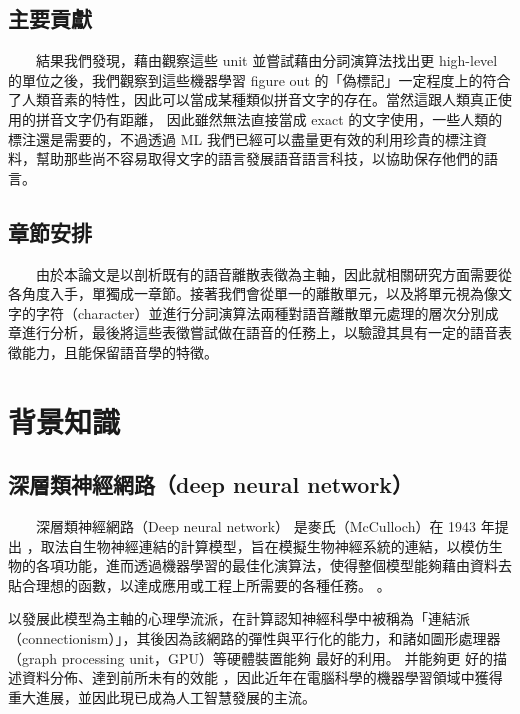 \section{主要貢獻}  %

　　結果我們發現，藉由觀察這些 unit 並嘗試藉由分詞演算法找出更 high-level 的單位之後，我們觀察到這些機器學習 figure out 的「偽標記」一定程度上的符合了人類音素的特性，因此可以當成某種類似拼音文字的存在。當然這跟人類真正使用的拼音文字仍有距離，
因此雖然無法直接當成 exact 的文字使用，一些人類的標注還是需要的，不過透過 ML 我們已經可以盡量更有效的利用珍貴的標注資料，幫助那些尚不容易取得文字的語言發展語音語言科技，以協助保存他們的語言。


\section{章節安排}

　　由於本論文是以剖析既有的語音離散表徵為主軸，因此就相關研究方面需要從各角度入手，單獨成一章節。接著我們會從單一的離散單元，以及將單元視為像文字的字符（character）並進行分詞演算法兩種對語音離散單元處理的層次分別成章進行分析，最後將這些表徵嘗試做在語音的任務上，以驗證其具有一定的語音表徵能力，且能保留語音學的特徵。






\chapter{背景知識}
\section{深層類神經網路（deep neural network）}

　　深層類神經網路（Deep neural network） 是麥氏（McCulloch）在 1943 年提出 \cite{mcculloch1943logical}，取法自生物神經連結的計算模型，旨在模擬生物神經系統的連結，以模仿生物的各項功能，進而透過機器學習的最佳化演算法，使得整個模型能夠藉由資料去貼合理想的函數，以達成應用或工程上所需要的各種任務。 。

    以發展此模型為主軸的心理學流派，在計算認知神經科學中被稱為「連結派（connectionism）」，其後因為該網路的彈性與平行化的能力，和諸如圖形處理器（graph processing unit，GPU）等硬體裝置能夠 最好的利用。 
    并能夠更 好的描述資料分佈、達到前所未有的效能 ，因此近年在電腦科學的機器學習領域中獲得重大進展，並因此現已成為人工智慧發展的主流。


